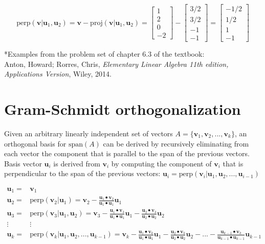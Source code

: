 \documentclass{article}
\begin{document}
\begin{itemize}
\[\text{perp}(\mathbf{v} | \mathbf{u}_1, \mathbf{u}_2) = \mathbf{v} - \text{proj}(\mathbf{v} | \mathbf{u}_1, \mathbf{u}_2) = \begin{bmatrix} 1 \\ 2 \\ 0 \\ -2 \end{bmatrix} - \begin{bmatrix} 3/2 \\ 3/2 \\ -1 \\ -1 \end{bmatrix} = \begin{bmatrix} -1/2 \\ 1/2 \\ 1 \\ -1 \end{bmatrix}\]
\end{itemize}

*Examples from the problem set of chapter 6.3 of the textbook: \\
Anton, Howard; Rorres, Chris, \emph{Elementary Linear Algebra 11th edition, Applications Version}, Wiley, 2014.




\section*{Gram-Schmidt orthogonalization}

Given an arbitrary linearly independent set of vectors \(A = \{\mathbf{v}_1, \mathbf{v}_2, ..., \mathbf{v}_k\}\), an orthogonal basis for \(\text{span}(A)\) can be derived by recursively eliminating from each vector the component that is parallel to the span of the previous vectors. Basis vector \(\mathbf{u}_i\) is derived from \(\mathbf{v}_i\) by computing the component of \(\mathbf{v}_i\) that is perpendicular to the span of the previous vectors: \(\mathbf{u}_i = \text{perp}(\mathbf{v}_i | \mathbf{u}_1, \mathbf{u}_2, ..., \mathbf{u}_{i-1})\)

\begin{align*}
\mathbf{u}_1 = & \mathbf{v}_1 \\  
\mathbf{u}_2 = & \text{perp}(\mathbf{v}_2 | \mathbf{u}_1) = \mathbf{v}_2 - \frac{\mathbf{u}_1 \bullet \mathbf{v}_2}{\mathbf{u}_1 \bullet \mathbf{u}_1}\mathbf{u}_1 \\  
\mathbf{u}_3 = & \text{perp}(\mathbf{v}_3 | \mathbf{u}_1, \mathbf{u}_2) = \mathbf{v}_3 - \frac{\mathbf{u}_1 \bullet \mathbf{v}_3}{\mathbf{u}_1 \bullet \mathbf{u}_1}\mathbf{u}_1 - \frac{\mathbf{u}_2 \bullet \mathbf{v}_3}{\mathbf{u}_2 \bullet \mathbf{u}_2}\mathbf{u}_2 \\
\vdots & \vdots \\ 
\mathbf{u}_k = & \text{perp}(\mathbf{v}_k | \mathbf{u}_1, \mathbf{u}_2, ..., \mathbf{u}_{k-1}) = \mathbf{v}_k - \frac{\mathbf{u}_1 \bullet \mathbf{v}_k}{\mathbf{u}_1 \bullet \mathbf{u}_1}\mathbf{u}_1 - \frac{\mathbf{u}_2 \bullet \mathbf{v}_k}{\mathbf{u}_2 \bullet \mathbf{u}_2}\mathbf{u}_2 - ...  - \frac{\mathbf{u}_{k-1} \bullet \mathbf{v}_k}{\mathbf{u}_{k-1} \bullet \mathbf{u}_{k-1}}\mathbf{u}_{k-1}
\end{align*}
\end{document}
